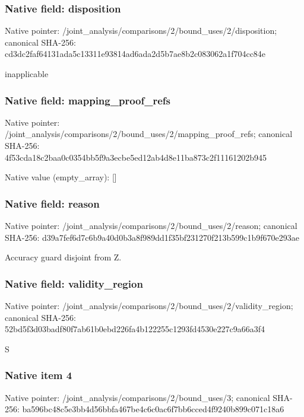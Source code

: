 \documentclass[10pt,a4paper]{article}
\begin{document}
\subsubsection{Native field: disposition}
Native pointer: /joint\_\allowbreak{}analysis/comparisons/2/bound\_\allowbreak{}uses/2/disposition; canonical SHA-256: cd3dc2faf64131ada5c13311e93814ad6ada2d5b7ae8b2c083062a1f704cc84e

\begingroup\raggedright\sloppy inapplicable\par\endgroup

\subsubsection{Native field: mapping\_\allowbreak{}proof\_\allowbreak{}refs}
Native pointer: /joint\_\allowbreak{}analysis/comparisons/2/bound\_\allowbreak{}uses/2/mapping\_\allowbreak{}proof\_\allowbreak{}refs; canonical SHA-256: 4f53cda18c2baa0c0354bb5f9a3ecbe5ed12ab4d8e11ba873c2f11161202b945

Native value (empty\_\allowbreak{}array): []

\subsubsection{Native field: reason}
Native pointer: /joint\_\allowbreak{}analysis/comparisons/2/bound\_\allowbreak{}uses/2/reason; canonical SHA-256: d39a7fef6d7c6b9a40d0b3a8f989dd1f35bf231270f213b599c1b9f670e293ae

\begingroup\raggedright\sloppy Accuracy guard disjoint from Z.\par\endgroup

\subsubsection{Native field: validity\_\allowbreak{}region}
Native pointer: /joint\_\allowbreak{}analysis/comparisons/2/bound\_\allowbreak{}uses/2/validity\_\allowbreak{}region; canonical SHA-256: 52bd5f3d03badf80f7ab61b0ebd226fa4b122255c1293fd4530e227c9a66a3f4

\begingroup\raggedright\sloppy S\par\endgroup

\subsubsection{Native item 4}
Native pointer: /joint\_\allowbreak{}analysis/comparisons/2/bound\_\allowbreak{}uses/3; canonical SHA-256: ba596bc48c5e3bb4d56bbfa467be4c6c0ac6f7bb6cced4f9240b899c071c18a6
\end{document}
